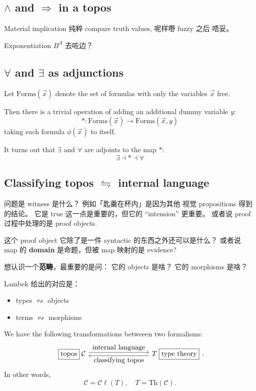 \subsection{$\wedge$ and $\Rightarrow$ in a topos}

Material implication 纯粹 compare truth values, 呢样嘢 fuzzy 之后 唔妥。

Exponentiation $B^A$ 去咗边？

\subsection{$\forall$ and $\exists$ as adjunctions}

Let $\mbox{Forms}(\vec{x})$ denote the set of formulas with only the variables $\vec{x}$ free.

Then there is a trivial operation of adding an additional dummy variable $y$:
\begin{equation}
* : \mbox{Forms}(\vec{x}) \rightarrow \mbox{Forms}(\vec{x}, y)
\end{equation}
taking each formula $\phi(\vec{x})$ to itself.

It turns out that $\exists$ and $\forall$ are adjoints to the map $*$:
\begin{equation}
\exists \dashv * \dashv \forall
\end{equation}

\subsection{Classifying topos $\leftrightharpoons$ internal language}

问题是 witness 是什么？  例如「匙羹在杯内」是因为其他 视觉 propositions 得到的结论。 它是 true 这一点是重要的，但它的 ``intension'' 更重要。  或者说 proof 过程中处理的是 proof objects.  

这个 proof object 它除了是一件 syntactic 的东西之外还可以是什么？  或者说 map 的 \textbf{domain} 是命题，但被 map 映射的是 evidence?

想认识一个\textbf{范畴}，最重要的是问： 它的 objects 是啥？ 它的 morphisms 是啥？ 

Lambek 给出的对应是：
\begin{itemize}
	\item types $\leftrightsquigarrow$ objects
	\item terms $\leftrightsquigarrow$ morphisms
\end{itemize}

We have the following transformations betweeen two formalisms:
\begin{equation}
\begin{tikzcd}[column sep = 20ex]
\boxed{\mbox{topos}} \; \mathcal{C}
\arrow[r, shift left, "\mbox{internal language}"]
& T \; \boxed{\mbox{type theory}}
\arrow[l, shift left, "\mbox{classifying topos}"]
\end{tikzcd}.
\end{equation}
In other words,
\begin{equation}
\mathcal{C} = \mathcal{C}\ell(T), \quad T = \mathrm{Th}(\mathcal{C}).
\end{equation}

